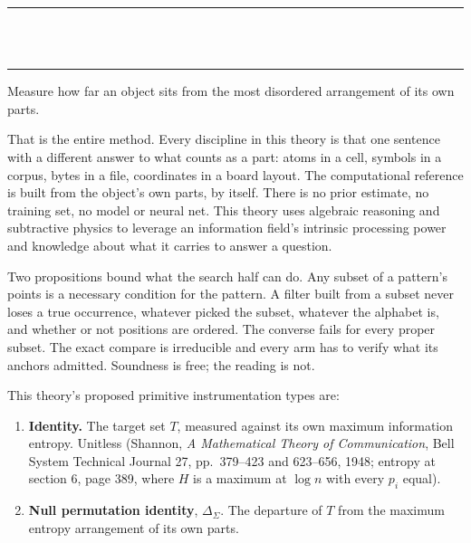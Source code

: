 \thispagestyle{empty}
\begin{center}
  \rule{\textwidth}{0.4pt}\\[0.9em]
  {\Large{}}\\[0.7em]
  \rule{\textwidth}{0.4pt}
\end{center}
\bigskip

\noindent Measure how far an object sits from the most disordered arrangement of its own parts.

That is the entire method. Every discipline in this theory is that one sentence with a different answer to
what counts as a part: atoms in a cell, symbols in a corpus, bytes in a file, coordinates in a board
layout. The computational reference is built from the object's own parts, by itself. There is no prior
estimate, no training set, no model or neural net. This theory uses algebraic reasoning and
subtractive physics to leverage an information field's intrinsic processing power and knowledge
about what it carries to answer a question.

Two propositions bound what the search half can do. Any subset of a pattern's points is a necessary
condition for the pattern. A filter built from a subset never loses a true occurrence, whatever
picked the subset, whatever the alphabet is, and whether or not positions are ordered. The converse fails for every proper subset. The exact compare is irreducible and every
arm has to verify what its anchors admitted. Soundness is free; the reading is not.

This theory's proposed primitive instrumentation types are:

\begin{enumerate}
  \item \textbf{Identity.} The target set \(T\), measured against its own maximum information
    entropy. Unitless (Shannon, \emph{A Mathematical Theory of Communication}, Bell System
    Technical Journal 27, pp.~379--423 and 623--656, 1948; entropy at section 6, page 389, where
    \(H\) is a maximum at \(\log n\) with every \(p_i\) equal).
  \item \textbf{Null permutation identity}, \(\Delta_{\Sigma}\). The departure of \(T\) from the
    maximum entropy arrangement of its own parts.
\end{enumerate}

